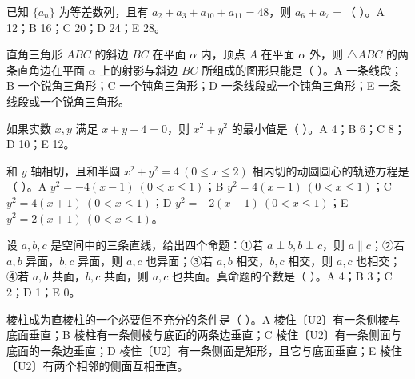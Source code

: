 \begin{question}
已知 $\{a_n\}$ 为等差数列，且有 $a_2+a_3+a_{10}+a_{11}=48$，则 $a_6+a_7=$（ ）。A 12；B 16；C 20；D 24；E 28。

\end{question}
\begin{question}
直角三角形 $ABC$ 的斜边 $BC$ 在平面 $\alpha$ 内，顶点 $A$ 在平面 $\alpha$ 外，则 $\triangle ABC$ 的两条直角边在平面 $\alpha$ 上的射影与斜边 $BC$ 所组成的图形只能是（ ）。A 一条线段；B 一个锐角三角形；C 一个钝角三角形；D 一条线段或一个钝角三角形；E 一条线段或一个锐角三角形。

\end{question}
\begin{question}
如果实数 $x,y$ 满足 $x+y-4=0$，则 $x^2+y^2$ 的最小值是（ ）。A 4；B 6；C 8；D 10；E 12。

\end{question}
\begin{question}
和 $y$ 轴相切，且和半圆 $x^2+y^2=4\ (0\leq x\leq2)$ 相内切的动圆圆心的轨迹方程是（ ）。A $y^2=-4(x-1)\ (0<x\leq1)$；B $y^2=4(x-1)\ (0<x\leq1)$；C $y^2=4(x+1)\ (0<x\leq1)$；D $y^2=-2(x-1)\ (0<x\leq1)$；E $y^2=2(x+1)\ (0<x\leq1)$。

\end{question}
\begin{question}
设 $a,b,c$ 是空间中的三条直线，给出四个命题：①若 $a\perp b,b\perp c$，则 $a\parallel c$；②若 $a,b$ 异面，$b,c$ 异面，则 $a,c$ 也异面；③若 $a,b$ 相交，$b,c$ 相交，则 $a,c$ 也相交；④若 $a,b$ 共面，$b,c$ 共面，则 $a,c$ 也共面。真命题的个数是（ ）。A 4；B 3；C 2；D 1；E 0。

\end{question}
\begin{question}
棱柱成为直棱柱的一个必要但不充分的条件是（ ）。A 棱住〔U2〕有一条侧棱与底面垂直；B 棱柱有一条侧棱与底面的两条边垂直；C 棱住〔U2〕有一条侧面与底面的一条边垂直；D 棱住〔U2〕有一条侧面是矩形，且它与底面垂直；E 棱住〔U2〕有两个相邻的侧面互相垂直。

\end{question}

